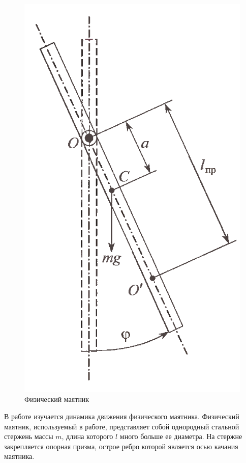 \documentclass[a4paper,12pt]{article}
\begin{document}
 	\begin{figure}
 		\includegraphics[width=1\linewidth]{ustanovka}
 		\caption{Физический маятник}\label{risunok}
 	\end{figure}
 	
 	\par В работе изучается динамика движения физического маятника.
 	Физический маятник, используемый в работе, представляет собой однородный стальной стержень массы $m$, длина которого $l$ много больше ее диаметра. На стержне закрепляется опорная призма, острое ребро которой является осью качания маятника.
 	
\end{document}
